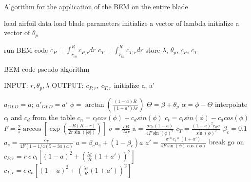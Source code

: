 \begin{algorithm}
\caption{Algorithm for the application of the BEM on the entire blade}
\label{main_BEM}
\begin{algorithmic}
\State load airfoil data
\State load blade parameters
\State initialize a vector of lambda
\State initialize a vector of $\theta_p$

    \State run BEM code
    \EndFor 
    \State $c_P = \int_{r_{in}}^{R}c_{P,r}dr$
    \State $c_T = \int_{r_{in}}^{R}c_{T,r}dr$
    \State store $\lambda$, $\theta_p$, $c_P$, $c_T$
 \EndFor
\EndFor 
\end{algorithmic}
\end{algorithm}

\begin{algorithm}
\caption{BEM code pseudo algorithm}
\label{detailed_BEM}
\begin{algorithmic}
\State INPUT: $r, \theta_p, \lambda$
\State OUTPUT: $c_{P,r}, \ c_{T,r}$
\State initialize a, a'

  \State  $a_{OLD}=a; \ a'_{OLD}=a'$
  \State  $\phi = \arctan\left(\frac{(1-a)R}{(1+a')\lambda r}\right)$ 
  \State  $\Theta = \beta + \theta_p$
  \State  $\alpha = \phi - \Theta$
  \State  interpolate $c_l$ and $c_d$ from the table
  \State  $c_n = c_l cos(\phi) + c_d sin(\phi)$
  \State  $c_t = c_l sin(\phi) - c_d cos(\phi)$
  \State  $F = \frac{2}{\pi} \arccos \left[\exp\left(\frac{-B(R - r)}{2r\sin(\left|\phi\right|)}\right)\right]$
  \State  $\sigma = \frac{cB}{2\pi r}$
  \State  a = $\frac{\sigma c_n (1 - a)}{4 F \sin(\phi)^2}$
  \Else
    \State  $c_T = \frac{(1 - a)^2c_n\sigma}{\sin(\phi)^2}$
    \State  $\beta_c = 0.1$
    \State  $a_s = \frac{c_T}{4F(1 - 1/4(5 - 3a)a)}$
    \State  $a = \beta_c a_s + (1 - \beta_c)a$
  \EndIf
  \State  $a' = \frac{\sigma*c_t*(1 + a')}{4F\sin(\phi)\cos(\phi)}$
    \State break
  \Else
    \State go on
  \EndIf
\EndFor
\State  $c_{P,r} = r \ c \ c_t\left[(1 - a)^2 + \left(\frac{\lambda r}{R}(1 + a')\right)^2\right]$
\State  $c_{T,r} = c \ c_n\left[(1 - a)^2 + \left(\frac{\lambda r}{R}(1 + a')\right)^2\right]$
\end{algorithmic}
\end{algorithm}